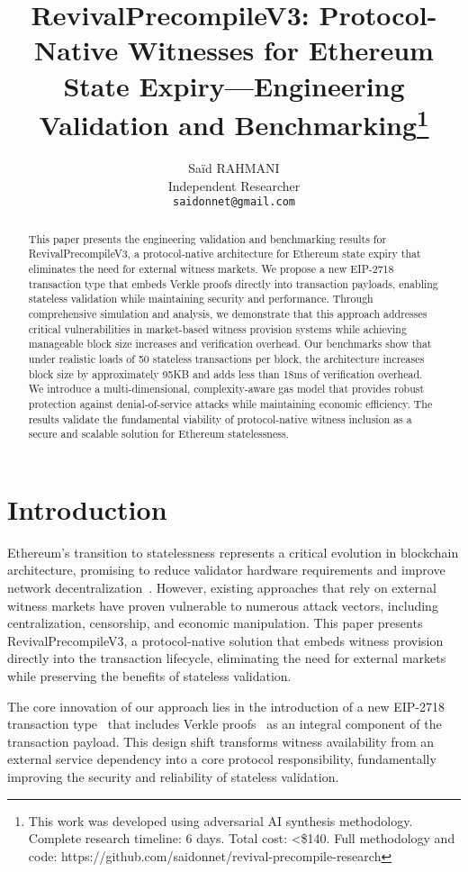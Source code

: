 \documentclass{article}
\title{RevivalPrecompileV3: Protocol-Native Witnesses for Ethereum State Expiry—Engineering Validation and Benchmarking\thanks{This work was developed using adversarial AI synthesis methodology. Complete research timeline: 6 days. Total cost: <\$140. Full methodology and code: https://github.com/saidonnet/revival-precompile-research}}
\author{
  Saïd RAHMANI \\
  Independent Researcher \\
  \texttt{saidonnet@gmail.com}
}
\date{}
\begin{document}
\maketitle

\begin{abstract}
This paper presents the engineering validation and benchmarking results for RevivalPrecompileV3, a protocol-native architecture for Ethereum state expiry that eliminates the need for external witness markets. We propose a new EIP-2718 transaction type that embeds Verkle proofs directly into transaction payloads, enabling stateless validation while maintaining security and performance. Through comprehensive simulation and analysis, we demonstrate that this approach addresses critical vulnerabilities in market-based witness provision systems while achieving manageable block size increases and verification overhead. Our benchmarks show that under realistic loads of 50 stateless transactions per block, the architecture increases block size by approximately 95KB and adds less than 18ms of verification overhead. We introduce a multi-dimensional, complexity-aware gas model that provides robust protection against denial-of-service attacks while maintaining economic efficiency. The results validate the fundamental viability of protocol-native witness inclusion as a secure and scalable solution for Ethereum statelessness.
\end{abstract}

\section{Introduction}

Ethereum's transition to statelessness represents a critical evolution in blockchain architecture, promising to reduce validator hardware requirements and improve network decentralization~\cite{buterin2021statelessness}. However, existing approaches that rely on external witness markets have proven vulnerable to numerous attack vectors, including centralization, censorship, and economic manipulation. This paper presents RevivalPrecompileV3, a protocol-native solution that embeds witness provision directly into the transaction lifecycle, eliminating the need for external markets while preserving the benefits of stateless validation.

The core innovation of our approach lies in the introduction of a new EIP-2718 transaction type~\cite{zoltu2020eip2718} that includes Verkle proofs~\cite{kuszmaul2018verkle} as an integral component of the transaction payload. This design shift transforms witness availability from an external service dependency into a core protocol responsibility, fundamentally improving the security and reliability of stateless validation.
\end{document}
